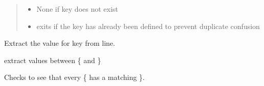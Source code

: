 \documentclass[letterpaper,10pt,english]{sphinxmanual}
\begin{document}
\begin{fulllineitems}
\begin{fulllineitems}
\begin{quote}
\begin{description}
\begin{itemize}
\item {} 
None \textendash{} if key does not exist

\item {} 
exits \textendash{} if the key has already been defined to prevent duplicate confusion

\end{itemize}


\end{description}\end{quote}

\end{fulllineitems}


\begin{fulllineitems}
\label{\detokenize{pydfnworks:pydfnworks.dfnGen.gen_input.input_helper.find_val}}
Extract the value for key from line.

\end{fulllineitems}


\begin{fulllineitems}
\label{\detokenize{pydfnworks:pydfnworks.dfnGen.gen_input.input_helper.get_groups}}
extract values between \{ and \}

\end{fulllineitems}


\begin{fulllineitems}
\label{\detokenize{pydfnworks:pydfnworks.dfnGen.gen_input.input_helper.has_curlys}}
Checks to see that every \{ has a matching \}.

\end{fulllineitems}


\end{fulllineitems}
\end{document}
